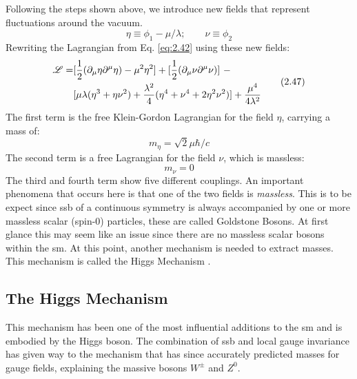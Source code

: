 %
Following the steps shown above, we introduce new fields that represent fluctuations around the vacuum.
%
\begin{equation}\label{eq:2.46}
    \eta \equiv \phi_{1}-\mu/\lambda; \qquad \nu \equiv \phi_{2}
\tag{2.46}
\end{equation}
%
Rewriting the Lagrangian from Eq. \ref{eq:2.42} using these new fields:
%
\begin{equation}\label{eq:2.47}
\begin{split}
    \Lagr = &[\frac{1}2(\partial_{\mu}\eta\partial^{\mu}\eta)  - \mu^{2}\eta^{2}] + [\frac{1}2(\partial_{\mu}\nu\partial^{\mu}\nu)] \ - \ \\  
    &[\mu\lambda(\eta^{3} + \eta\nu^{2}) + \frac{\lambda^{2}}4(\eta^{4}+\nu^{4}+2\eta^{2}\nu^{2})] + \frac{\mu^{4}}{4\lambda^{2}}
\end{split}
\tag{2.47}
\end{equation}
%
The first term is the free Klein-Gordon Lagrangian for the field $\eta$, carrying a mass of:
\begin{equation}\label{eq:2.48}
    m_{\eta} = \sqrt{2}\mu\hbar/c
\tag{2.48}
\end{equation}
%
The second term is a free Lagrangian for the field $\nu$, which is massless:
%
\begin{equation}\label{eq:2.49}
    m_{\nu} = 0
\tag{2.49}
\end{equation}
%
The third and fourth term show five different couplings. An important phenomena that occurs here is that 
one of the two fields is \textit{massless}. This is to be expect since \gls{ssb} of a continuous symmetry 
is always accompanied by one or more massless scalar (spin-0) particles, these are called Goldstone Bosons.
At first glance this may seem like an issue since there are no massless scalar bosons within the \gls{sm}.
At this point, another mechanism is needed to extract masses. This mechanism is called the Higgs Mechanism \cite{Higgs}.

\subsection{The Higgs Mechanism}

This mechanism has been one of the most influential additions to the \gls{sm} and is embodied by the Higgs boson. The 
combination of \gls{ssb} and local gauge invariance has given way to the mechanism that has since accurately predicted
masses for gauge fields, explaining the massive bosons $W^{\pm}$ and $Z^{0}$.

